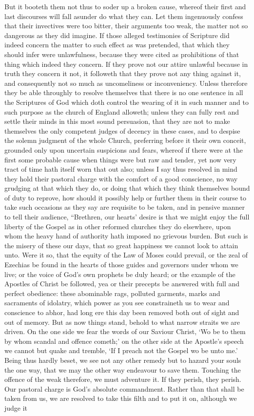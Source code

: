 But it booteth them not thus to soder up a broken cause, whereof their first and last discourses will fall asunder do what they can. Let them ingenuously confess that their invectives were too bitter, their arguments too weak, the matter not so dangerous as they did imagine. If those alleged testimonies of Scripture did indeed concern the matter to such effect as was pretended, that which they should infer were unlawfulness, because they were cited as prohibitions of that thing which indeed they concern. If they prove not our attire unlawful because in truth they concern it not, it followeth that they prove not any thing against it, and consequently not so much as uncomeliness or inconveniency. Unless therefore they be able throughly to resolve themselves that there is no  one sentence in all the Scriptures of God which doth control the wearing of it in such manner and to such purpose as the church of England alloweth; unless they can fully rest and settle their minds in this most sound persuasion, that they are not to make themselves the only competent judges of decency in these cases, and to despise the solemn judgment of the whole Church, preferring before it their own conceit, grounded only upon uncertain suspicions and fears, whereof if there were at the first some probable cause when things were but raw and tender, yet now very tract of time hath itself worn that out also; unless I say thus resolved in mind they hold their pastoral charge with the comfort of a good conscience, no way grudging at that which they do, or doing that which they think themselves bound of duty to reprove, how should it possibly help or further them in their course to take such occasions as they say are requisite to be taken, and in pensive manner to tell their audience, “Brethren, our hearts’ desire is that we might enjoy the full liberty of the Gospel as in other reformed churches they do elsewhere, upon whom the heavy hand of authority hath imposed no grievous burden. But such is the misery of these our days, that so great happiness we cannot look to attain unto. Were it so, that the equity of the Law of Moses could prevail, or the zeal of Ezechias be found in the hearts of those guides and governors under whom we live; or the voice of God’s own prophets be duly heard; or the example of the Apostles of Christ be followed, yea or their precepts be answered with full and perfect obedience: these abominable rags, polluted garments, marks and sacraments of idolatry, which power as you see constraineth us to wear and conscience to abhor, had long ere this day been removed both out of sight and out of memory. But as now things stand, behold to what narrow straits we are driven. On the one side we fear the words of our Saviour Christ, ‘Wo be to them by whom scandal and offence cometh;’ on the other side at the Apostle’s speech we cannot but quake and tremble, ‘If I preach not the Gospel wo be unto me.’ Being thus hardly beset, we see not any other remedy but to hazard your souls the one way, that we may the other way endeavour to save them. Touching the offence of the weak therefore, we must  adventure it. If they perish, they perish. Our pastoral charge is God’s absolute commandment. Rather than that shall be taken from us, we are resolved to take this filth and to put it on, although we judge it 